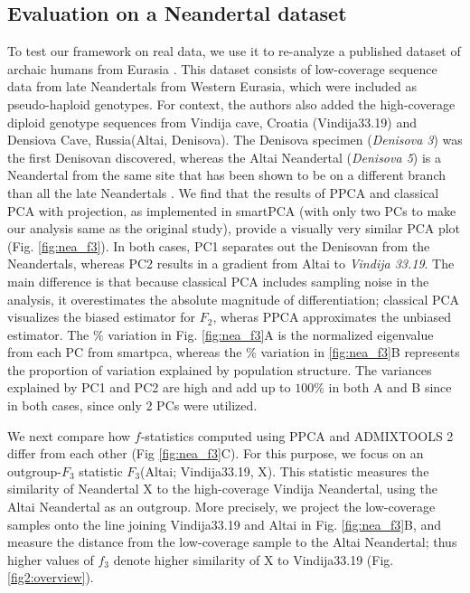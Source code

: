 \documentclass[12pt]{article}
\begin{document}
\subsection{Evaluation on a Neandertal dataset}
To test our framework on real data, we use it to re-analyze a published dataset of archaic humans from Eurasia \citep{hajdinjak_reconstructing_2018}. This dataset consists of low-coverage sequence data from late Neandertals from Western Eurasia, which were included as pseudo-haploid genotypes. For context, the authors also added the high-coverage diploid genotype sequences from Vindija cave, Croatia (Vindija33.19)\citep{prufer_high-coverage_2017} and Densiova Cave, Russia(Altai, Denisova)\citep{prufer_complete_2014, meyer_high-coverage_2012}. The Denisova specimen (\textit{Denisova 3}) was the first Denisovan discovered, whereas the Altai Neandertal (\textit{Denisova 5}) is a Neandertal from the same site that has been shown to be on a different branch than all the late Neandertals \citep{prufer_complete_2014, prufer_high-coverage_2017}. We find that the results of PPCA and classical PCA with projection, as implemented in smartPCA (with only two PCs to make our analysis same as the original study), provide a visually very similar PCA plot (Fig. \ref{fig:nea_f3}). In both cases, PC1 separates out the Denisovan from the Neandertals, whereas PC2 results in a gradient from Altai to \textit{Vindija 33.19}. 
The main difference is that because classical PCA includes sampling noise in the analysis, it overestimates the absolute magnitude of differentiation; classical PCA visualizes the biased estimator for $F_2$, wheras PPCA approximates the unbiased estimator. The $\%$ variation in Fig. \ref{fig:nea_f3}A is the normalized eigenvalue from each PC from smartpca, whereas the $\%$ variation in \ref{fig:nea_f3}B represents the proportion of variation explained by population structure. The variances explained by PC1 and PC2 are high and add up to $100\%$ in both A and B since in both cases, since only 2 PCs were utilized.

We next compare how $f$-statistics computed using PPCA and ADMIXTOOLS 2 differ from each other (Fig \ref{fig:nea_f3}C). For this purpose, we focus on an outgroup-$F_3$ statistic $F_3$(Altai; Vindija33.19, X). This statistic measures the similarity of Neandertal X to the high-coverage Vindija Neandertal, using the Altai Neandertal as an outgroup. More precisely, we project the low-coverage samples onto the line joining Vindija33.19 and Altai in Fig. \ref{fig:nea_f3}B, and measure the distance from the low-coverage sample to the Altai Neandertal; thus higher values of $f_3$ denote higher similarity of X to Vindija33.19 (Fig. \ref{fig2:overview}). 
\end{document}
